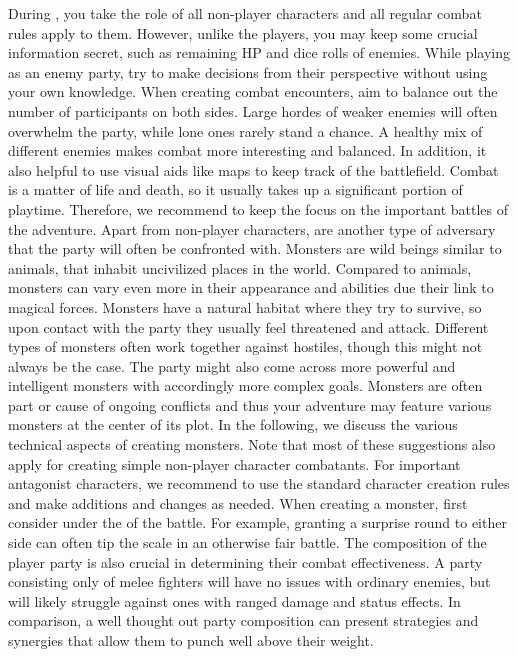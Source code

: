 %
\vfill
%
During , you take the role of all non-player characters and all regular combat rules apply to them. 
However, unlike the players, you may keep some crucial information secret, such as remaining HP and dice rolls of enemies.
While playing as an enemy party, try to make decisions from their perspective without using your own knowledge.
When creating combat encounters, aim to balance out the number of participants on both sides.
Large hordes of weaker enemies will often overwhelm the party, while lone ones rarely stand a chance.
A healthy mix of different enemies makes combat more interesting and balanced.
In addition, it also helpful to use visual aids like maps to keep track of the battlefield.
Combat is a matter of life and death, so it usually takes up a significant portion of playtime.
Therefore, we recommend to keep the focus on the important battles of the adventure.   
%
\vfill
%
Apart from non-player characters,  are another type of adversary that the party will often be confronted with. 
Monsters are wild beings similar to animals, that inhabit uncivilized places in the world.
Compared to animals, monsters can vary even more in their appearance and abilities due their link to magical forces.
Monsters have a natural habitat where they try to survive, so upon contact with the party they usually feel threatened and attack.
Different types of monsters often work together against hostiles, though this might not always be the case.
The party might also come across more powerful and intelligent monsters with accordingly more complex goals.
Monsters are often part or cause of ongoing conflicts and thus your adventure may feature various monsters at the center of its plot. 
In the following, we discuss the various technical aspects of creating monsters.
Note that most of these suggestions also apply for creating simple non-player character combatants. 
For important antagonist characters, we recommend to use the standard character creation rules and make additions and changes as needed.
%
\newpage
%
When creating a monster, first consider under the  of the battle.
For example, granting a surprise round to either side can often tip the scale in an otherwise fair battle.
The composition of the player party is also crucial in determining their combat effectiveness.
A party consisting only of melee fighters will have no issues with ordinary enemies, but will likely struggle against ones with ranged damage and status effects.
In comparison, a well thought out party composition can present strategies and synergies that allow them to punch well above their weight.

